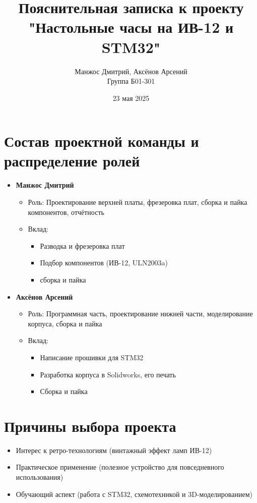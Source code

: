 \documentclass[a4paper,12pt]{article}
\title{Пояснительная записка к проекту \\ "Настольные часы на ИВ-12 и STM32"}
\author{Манжос Дмитрий, Аксёнов Арсений \\ Группа Б01-301}
\date{23 мая 2025}
\begin{document}
\maketitle

\section{Состав проектной команды и распределение ролей}
\begin{itemize}[leftmargin=*]
    \item \textbf{Манжос Дмитрий}
    \begin{itemize}
        \item {Роль:} Проектирование верхней платы, фрезеровка плат, сборка и пайка компонентов, отчётность
        \item {Вклад:}
        \begin{itemize}
            \item Разводка и фрезеровка плат
            \item Подбор компонентов (ИВ-12, ULN2003a)
            \item сборка и пайка
        \end{itemize}
    \end{itemize}
    
    \item \textbf{Аксёнов Арсений}
    \begin{itemize}
        \item {Роль:} Программная часть, проектирование нижней части,  моделирование корпуса, сборка и пайка
        \item {Вклад:}
        \begin{itemize}
            \item Написание прошивки для STM32
            \item Разработка корпуса в Solidworks, его печать
            \item Сборка и пайка
        \end{itemize}
    \end{itemize}
\end{itemize}

\section{Причины выбора проекта}
\begin{itemize}
    \item Интерес к ретро-технологиям (винтажный эффект ламп ИВ-12)
    \item Практическое применение (полезное устройство для повседневного использования)
    \item Обучающий аспект (работа с STM32, схемотехникой и 3D-моделированием)
\end{itemize}
\end{document}

